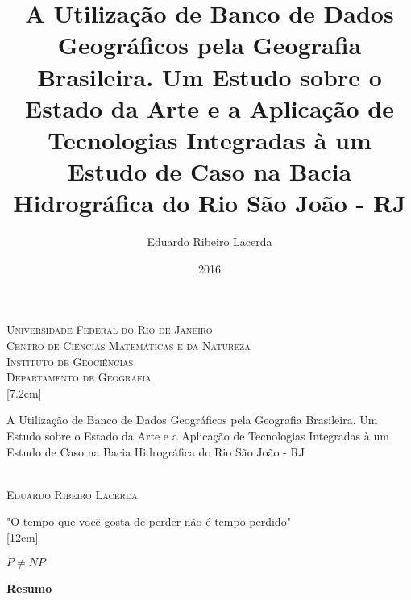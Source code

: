 \documentclass[12pt,a4paper,openany]{book} %
\title{A Utilização de Banco de Dados Geográficos pela Geografia Brasileira. Um Estudo sobre o Estado da Arte e a Aplicação de Tecnologias Integradas à um Estudo de Caso na Bacia Hidrográfica do Rio São João - RJ}
\author{Eduardo Ribeiro Lacerda}
\date{2016}
\begin{document}
	
	\begin{titlepage}
		
		\begin{center}
			\textsc{\large Universidade Federal do Rio de Janeiro} \\
			\textsc{\large Centro de Ciências Matemáticas e da Natureza} \\
			\textsc{\large Instituto de Geociências} \\
			\textsc{\large Departamento de Geografia} \\
			[7.2cm]
		\end{center}
		\Large{A Utilização de Banco de Dados Geográficos pela Geografia Brasileira. Um Estudo sobre o Estado da Arte e a Aplicação de Tecnologias Integradas à um Estudo de Caso na Bacia Hidrográfica do Rio São João - RJ} \\
		[6cm] \\
		\begin{flushright}
			\textsc{\large Eduardo Ribeiro Lacerda \\}
		\end{flushright} 
	\end{titlepage}
	
	
	\newpage
	\begin{center}
		\vspace*{\fill}
		"O tempo que você gosta de perder não é tempo perdido" \\ 
		[12cm]
	\end{center}
	
	\newpage
	\begin{center}
		\vspace*{\fill}
		$ P \neq NP $ \\ 
		[12cm]
	\end{center}

	\tableofcontents
	\listoffigures
	\listoftables
	
	\newpage
	\begin{center}
		\textbf{\LARGE Resumo}
	\end{center}
	
\end{document}
